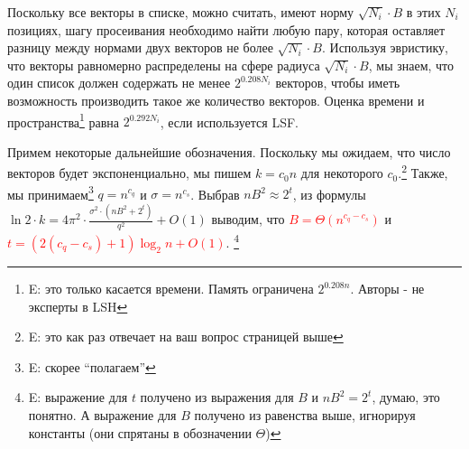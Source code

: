 \documentclass[a4paper,11pt]{article}
\begin{document}
Поскольку все векторы в списке, можно считать, имеют норму $\sqrt{N_i}\cdot B$ в этих $N_i$ позициях, шагу просеивания необходимо найти любую пару, которая оставляет разницу между нормами двух векторов не более $\sqrt{N_i}\cdot B$. Используя эвристику, что векторы равномерно распределены на сфере радиуса $\sqrt{N_i}\cdot B$, мы знаем, что один список должен содержать не менее $2^{0.208N_i }$ векторов, чтобы иметь возможность производить такое же количество векторов. Оценка времени и пространства\footnote{E: это только касается времени. Память ограничена $2^{0.208n }$. Авторы - не эксперты в LSH} равна $2^{0.292N_i}$, если используется LSF.

Примем некоторые дальнейшие обозначения. Поскольку мы ожидаем, что число векторов будет экспоненциально, мы пишем $k=c_0n$ для некоторого $c_0$.\footnote{E: это как раз отвечает на ваш вопрос страницей выше} Также, мы принимаем\footnote{E: скорее ``полагаем''} $q=n^{c_q}$ и $\sigma=n^{c_s}$. Выбрав $nB^2\approx2^t$, из формулы $\ln{2} \cdot k = 4\pi^2 \cdot \frac{\sigma^2 \cdot (nB^2+2^t)}{q^2} + O(1)$ выводим, что \textcolor{red}{$B=\Theta(n^{c_q-c_s})$} и \textcolor{red}{$t=(2(c_q-c_s)+1)\log_2 n + O(1)$}. \footnote{E: выражение для $t$ получено из выражения для $B$ и $nB^2 = 2^t$, думаю, это понятно. А выражение для $B$ получено из равенства выше, игнорируя константы (они спрятаны в обозначении $\Theta$)}
\end{document}
